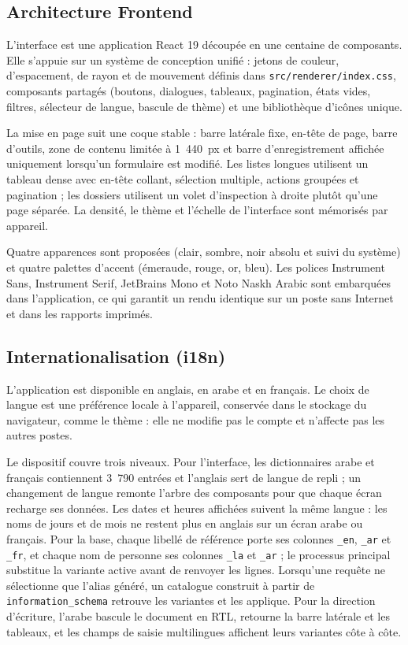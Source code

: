 \subsection{Architecture Frontend}
L'interface est une application React 19 découpée en une centaine de composants. Elle s'appuie sur un
système de conception unifié : jetons de couleur, d'espacement, de rayon et de mouvement définis dans
\texttt{src/renderer/index.css}, composants partagés (boutons, dialogues, tableaux, pagination, états
vides, filtres, sélecteur de langue, bascule de thème) et une bibliothèque d'icônes unique.

La mise en page suit une coque stable : barre latérale fixe, en-tête de page, barre d'outils, zone de
contenu limitée à 1~440~px et barre d'enregistrement affichée uniquement lorsqu'un formulaire est
modifié. Les listes longues utilisent un tableau dense avec en-tête collant, sélection multiple,
actions groupées et pagination ; les dossiers utilisent un volet d'inspection à droite plutôt qu'une
page séparée. La densité, le thème et l'échelle de l'interface sont mémorisés par appareil.

Quatre apparences sont proposées (clair, sombre, noir absolu et suivi du système) et quatre palettes
d'accent (émeraude, rouge, or, bleu). Les polices Instrument Sans, Instrument Serif, JetBrains Mono et
Noto Naskh Arabic sont embarquées dans l'application, ce qui garantit un rendu identique sur un poste
sans Internet et dans les rapports imprimés.

\subsection{Internationalisation (i18n)}
L'application est disponible en anglais, en arabe et en français. Le choix de langue est une préférence
locale à l'appareil, conservée dans le stockage du navigateur, comme le thème : elle ne modifie pas le
compte et n'affecte pas les autres postes.

Le dispositif couvre trois niveaux. Pour l'interface, les dictionnaires arabe et français contiennent
3~790 entrées et l'anglais sert de langue de repli ; un changement de langue remonte l'arbre des
composants pour que chaque écran recharge ses données. Les dates et heures affichées suivent la même
langue : les noms de jours et de mois ne restent plus en anglais sur un écran arabe ou français. Pour la base, chaque libellé de référence porte
ses colonnes \texttt{\_en}, \texttt{\_ar} et \texttt{\_fr}, et chaque nom de personne ses colonnes
\texttt{\_la} et \texttt{\_ar} ; le processus principal substitue la variante active avant de renvoyer
les lignes. Lorsqu'une requête ne sélectionne que l'alias généré, un catalogue construit à partir de
\texttt{information\_schema} retrouve les variantes et les applique. Pour la direction d'écriture,
l'arabe bascule le document en \ac{RTL}, retourne la barre latérale et les tableaux, et les champs de
saisie multilingues affichent leurs variantes côte à côte.

